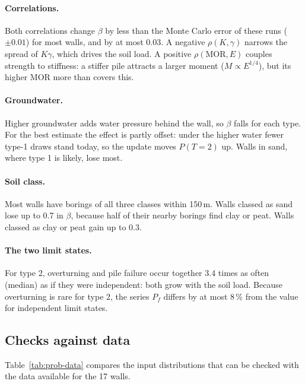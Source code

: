 \paragraph{Correlations.} Both correlations change $\beta$ by less than the
Monte Carlo error of these runs ($\pm 0.01$) for most walls, and by at most
0.03. A negative $\rho(K,\gamma)$ narrows the spread of $K\gamma$, which drives
the soil load. A positive $\rho(\text{MOR},E)$ couples strength to stiffness:
a stiffer pile attracts a larger moment ($M \propto E^{1/4}$), but its higher
MOR more than covers this.

\paragraph{Groundwater.} Higher groundwater adds water pressure behind the
wall, so $\beta$ falls for each type. For the best estimate the effect is
partly offset: under the higher water fewer type-1 draws stand today, so the
update moves $P(T{=}2)$ up. Walls in sand, where type 1 is likely, lose most.

\paragraph{Soil class.} Most walls have borings of all three classes within
150\,m. Walls classed as sand lose up to 0.7 in $\beta$, because half of their
nearby borings find clay or peat. Walls classed as clay or peat gain up to
0.3.

\paragraph{The two limit states.} For type 2, overturning and pile failure
occur together 3.4 times as often (median) as if they were independent: both
grow with the soil load. Because overturning is rare for type 2, the series
$P_f$ differs by at most 8\,\% from the value for independent limit states.

\subsection{Checks against data}\label{app:prob-data}

Table~\ref{tab:prob-data} compares the input distributions that can be
checked with the data available for the 17 walls.

